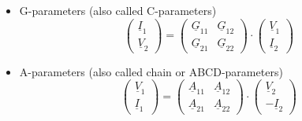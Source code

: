\begin{itemize}
\item G-parameters (also called C-parameters)
\begin{equation}
\label{eq:gparamdef}
\begin{pmatrix}
\underline{I}_{1}\\
\underline{V}_{2}
\end{pmatrix}
=
\begin{pmatrix}
\underline{G}_{11} & \underline{G}_{12}\\
\underline{G}_{21} & \underline{G}_{22}
\end{pmatrix}
\cdot
\begin{pmatrix}
\underline{V}_{1}\\
\underline{I}_{2}
\end{pmatrix}
\end{equation}

\item A-parameters (also called chain or ABCD-parameters)
\begin{equation}
\label{eq:aparamdef}
\begin{pmatrix}
\underline{V}_{1}\\
\underline{I}_{1}
\end{pmatrix}
=
\begin{pmatrix}
\underline{A}_{11} & \underline{A}_{12}\\
\underline{A}_{21} & \underline{A}_{22}
\end{pmatrix}
\cdot
\begin{pmatrix}
\underline{V}_{2}\\
-\underline{I}_{2}
\end{pmatrix}
\end{equation}

\end{itemize}

